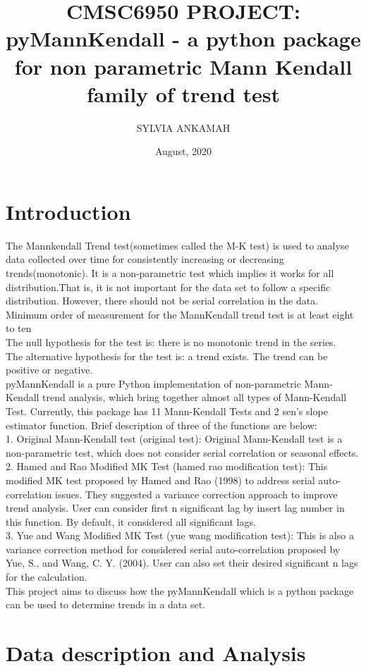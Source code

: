 \documentclass[12pt, letterpaper, twoside]{article}
\title{CMSC6950 PROJECT: 
pyMannKendall - a python package for non parametric Mann Kendall family of trend test}
\author{SYLVIA ANKAMAH}
\date{August, 2020}
\begin{document}
\maketitle
\section{Introduction}
The Mannkendall Trend test(sometimes called the M-K test) is used to analyse data collected over time for consistently increasing or decreasing trends(monotonic). It is a non-parametric test which implies it works for all distribution.That is, it is not important for the data set to follow a specific distribution. However, there should not be serial correlation in the data. Minimum order of measurement for the MannKendall trend test is at least eight to ten \\
The null hypothesis for the test is: there is no monotonic trend in the series.\\
The alternative hypothesis for the test is: a trend exists. The trend can be positive or negative.\\
pyMannKendall is a pure Python implementation of non-parametric Mann-Kendall trend analysis, which bring together almost all types of Mann-Kendall Test. Currently, this package has 11 Mann-Kendall Tests and 2 sen's slope estimator function. Brief description of three of the functions are below:\\
1. Original Mann-Kendall test (original test): Original Mann-Kendall test is a non-parametric test, which does not consider serial correlation or seasonal effects.\\
2. Hamed and Rao Modified MK Test (hamed rao modification test): This modified MK test proposed by Hamed and Rao (1998) to address serial auto-correlation issues. They suggested a variance correction approach to improve trend analysis. User can consider first n significant lag by insert lag number in this function. By default, it considered all significant lags.\\
3. Yue and Wang Modified MK Test (yue wang modification test): This is also a variance correction method for considered serial auto-correlation proposed by Yue, S., and  Wang, C. Y. (2004). User can also set their desired significant n lags for the calculation.\\
This project aims to discuss how the pyMannKendall which is a python package can be used to determine trends in a data set.\\


\section{Data description and Analysis}
\end{document}
